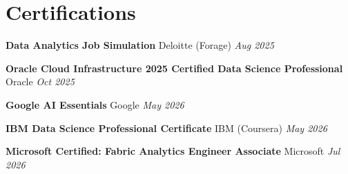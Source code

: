 \documentclass[letterpaper,10.5pt]{article}
\begin{document}
\section{Certifications}
\vspace{2pt}
\begin{itemize}[leftmargin=0.13in, label={}, itemsep=3pt, topsep=0pt]
  \small{
    \item \textbf{Data Analytics Job Simulation} \textemdash{} Deloitte (Forage) \hfill \textit{Aug 2025}
    \item \textbf{Oracle Cloud Infrastructure 2025 Certified Data Science Professional} \textemdash{} Oracle \hfill \textit{Oct 2025}
    \item \textbf{Google AI Essentials} \textemdash{} Google \hfill \textit{May 2026}
    \item \textbf{IBM Data Science Professional Certificate} \textemdash{} IBM (Coursera) \hfill \textit{May 2026}
    \item \textbf{Microsoft Certified: Fabric Analytics Engineer Associate} \textemdash{} Microsoft \hfill \textit{Jul 2026}
  }
\end{itemize}
\end{document}
